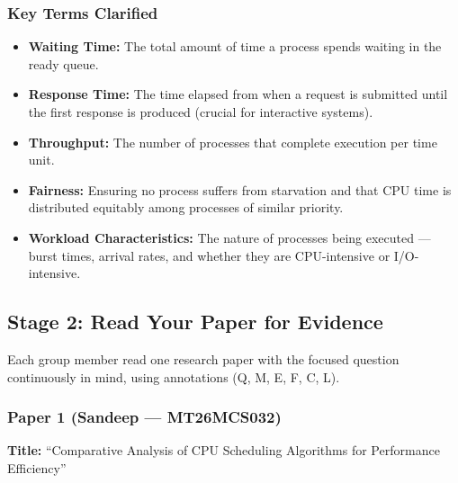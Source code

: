 \documentclass[11pt, a4paper]{article}
\begin{document}
\subsubsection*{Key Terms Clarified}
\begin{itemize}[nosep]
    \item \textbf{Waiting Time:} The total amount of time a process spends waiting in the ready queue.
    \item \textbf{Response Time:} The time elapsed from when a request is submitted until the first response is produced (crucial for interactive systems).
    \item \textbf{Throughput:} The number of processes that complete execution per time unit.
    \item \textbf{Fairness:} Ensuring no process suffers from starvation and that CPU time is distributed equitably among processes of similar priority.
    \item \textbf{Workload Characteristics:} The nature of processes being executed --- burst times, arrival rates, and whether they are CPU-intensive or I/O-intensive.
\end{itemize}

\subsection{Stage 2: Read Your Paper for Evidence}
Each group member read one research paper with the focused question continuously in mind, using annotations (Q, M, E, F, C, L).

\subsubsection*{Paper 1 (Sandeep --- MT26MCS032)}
\textbf{Title:} ``Comparative Analysis of CPU Scheduling Algorithms for Performance Efficiency''
\end{document}
